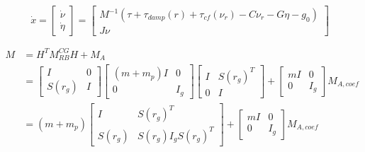 \documentclass[12pt,a4]{article}
\begin{document}
\begin{equation}
	\dot{x} =
	\begin{bmatrix}\dot{\nu}\\\dot{\eta}\end{bmatrix}
	=
	\begin{bmatrix}
		M^{-1}(\tau + \tau_{damp}(r) + \tau_{cf}(\nu_r) - C  \nu_r - G  \eta - g_0) \\
		J \nu
	\end{bmatrix}
\end{equation}


\begin{align*}
	M & = H^T M_{RB}^{CG} H + M_A \\
	  & =
	\begin{bmatrix} I & 0 \\ S(r_g)  & I \end{bmatrix}
	\begin{bmatrix}
		(m+m_p)I & 0   \\
		0        & I_g
	\end{bmatrix}
	\begin{bmatrix} I & S(r_g)^T\\ 0  & I \end{bmatrix}
	+
	\begin{bmatrix}
		mI & 0   \\
		0  & I_g
	\end{bmatrix}
	M_{A,coef}                    \\
	  & =
	(m+m_p)
	\begin{bmatrix}
		I      & S(r_g)^T            \\
		S(r_g) & S(r_g) I_g S(r_g)^T
	\end{bmatrix}
	+
	\begin{bmatrix}
		mI & 0   \\
		0  & I_g
	\end{bmatrix}
	M_{A,coef}
\end{align*}
\end{document}
